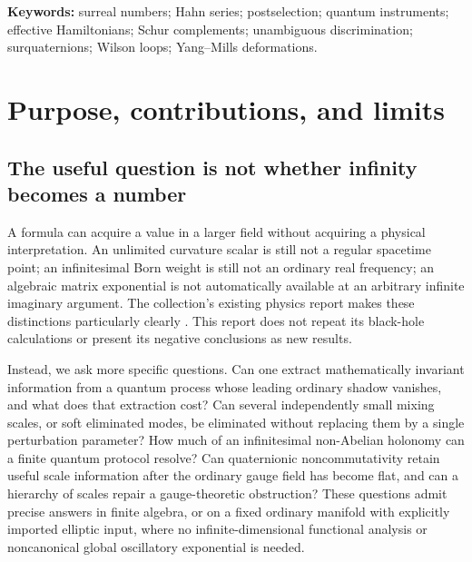 \documentclass[11pt,oneside]{article}
\numberwithin{equation}{section}
\theoremstyle{plain}
\theoremstyle{definition}
\theoremstyle{remark}
\begin{document}
\begin{abstract}
Established ingredients are distinguished from proposed formulations throughout, with the claim tiers of the collection's physics report. All applications are mathematical model applications, not claims of empirically new physics.
\end{abstract}

\noindent\textbf{Keywords:} surreal numbers; Hahn series; postselection; quantum instruments; effective Hamiltonians; Schur complements; unambiguous discrimination; surquaternions; Wilson loops; Yang--Mills deformations.

\tableofcontents
\newpage

\section{Purpose, contributions, and limits}\label{qgs:sec:intro}

\subsection{The useful question is not whether infinity becomes a number}
A formula can acquire a value in a larger field without acquiring a physical interpretation. An unlimited curvature scalar is still not a regular spacetime point; an infinitesimal Born weight is still not an ordinary real frequency; an algebraic matrix exponential is not automatically available at an arbitrary infinite imaginary argument. The collection's existing physics report makes these distinctions particularly clearly \cite{repoPhysics}. This report does not repeat its black-hole calculations or present its negative conclusions as new results.

Instead, we ask more specific questions. Can one extract mathematically invariant information from a quantum process whose leading ordinary shadow vanishes, and what does that extraction cost? Can several independently small mixing scales, or soft eliminated modes, be eliminated without replacing them by a single perturbation parameter? How much of an infinitesimal non-Abelian holonomy can a finite quantum protocol resolve? Can quaternionic noncommutativity retain useful scale information after the ordinary gauge field has become flat, and can a hierarchy of scales repair a gauge-theoretic obstruction? These questions admit precise answers in finite algebra, or on a fixed ordinary manifold with explicitly imported elliptic input, where no infinite-dimensional functional analysis or noncanonical global oscillatory exponential is needed.
\end{document}
